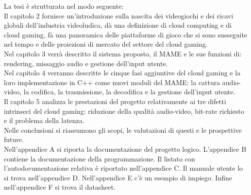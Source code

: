 La tesi è strutturata nel modo seguente:\\
Il capitolo 2 fornisce un'introduzione sulla nascita dei videogiochi e dei ricavi globali dell'industria videoludica, dà una definizione di cloud computing e di cloud gaming, fà una panoramica delle piattaforme di gioco che si sono susseguite nel tempo e delle proiezioni di mercato del settore del cloud gaming.\\
Nel capitolo 3 verrà descritto il sistema proposto, il MAME e le sue funzioni di: rendering, missaggio audio e gestione dell'input utente.\\
Nel capitolo 4 verranno descritte le cinque fasi aggiuntive del cloud gaming e la loro implementazione in C++ come nuovi moduli del MAME: la cattura audio-video, la codifica, la trasmissione, la decodifica e la gestione dell'input utente.\\
Il capitolo 5 analizza le prestazioni del progetto relativamente ai tre difetti intrinseci del cloud gaming: riduzione della qualità audio-video, bit-rate richiesto e il problema della latenza.\\
Nelle conclusioni si riassumono gli scopi, le valutazioni di questi e le prospettive future.\\
Nell'appendice A si riporta la documentazione del progetto logico. L'appendice B contiene la documentazione della programmazione. Il listato con l’autodocumentazione relativa è riportato nell'appendice C. Il manuale utente lo si trova nell'appendice D. Nell'appendice E c'è un esempio di impiego. Infine nell'appendice F si trova il datasheet.